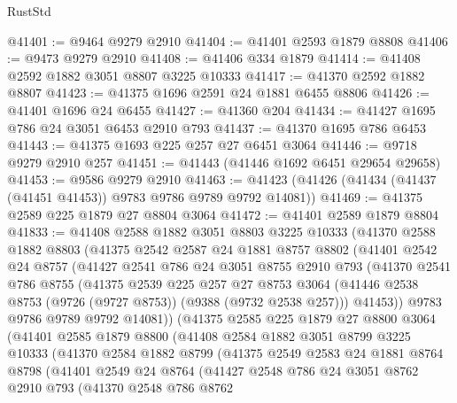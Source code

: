 \begin{lexlean}{RustStd}
\begin{coremodule}
@41401 := @9464 @9279 @2910
@41404 := @41401 @2593 @1879 @8808
@41406 := @9473 @9279 @2910
@41408 := @41406 @334 @1879
@41414 := @41408 @2592 @1882 @3051 @8807 @3225 @10333
@41417 := @41370 @2592 @1882 @8807
@41423 := @41375 @1696 @2591 @24 @1881 @6455 @8806
@41426 := @41401 @1696 @24 @6455
@41427 := @41360 @204
@41434 := @41427 @1695 @786 @24 @3051 @6453 @2910 @793
@41437 := @41370 @1695 @786 @6453
@41443 := @41375 @1693 @225 @257 @27 @6451 @3064
@41446 := @9718 @9279 @2910 @257
@41451 := @41443 (@41446 @1692 @6451 @29654 @29658)
@41453 := @9586 @9279 @2910
@41463 := @41423 (@41426 (@41434 (@41437 (@41451 @41453)) @9783 @9786 @9789 @9792 @14081))
@41469 := @41375 @2589 @225 @1879 @27 @8804 @3064
@41472 := @41401 @2589 @1879 @8804
@41833 := @41408
    @2588
    @1882
    @3051
    @8803
    @3225
    @10333
    (@41370
      @2588
      @1882
      @8803
      (@41375
        @2542
        @2587
        @24
        @1881
        @8757
        @8802
        (@41401
          @2542
          @24
          @8757
          (@41427
            @2541
            @786
            @24
            @3051
            @8755
            @2910
            @793
            (@41370
              @2541
              @786
              @8755
              (@41375
                @2539
                @225
                @257
                @27
                @8753
                @3064
                (@41446 @2538 @8753 (@9726 (@9727 @8753)) (@9388 (@9732 @2538 @257)))
                @41453))
            @9783
            @9786
            @9789
            @9792
            @14081))
        (@41375
          @2585
          @225
          @1879
          @27
          @8800
          @3064
          (@41401
            @2585
            @1879
            @8800
            (@41408
              @2584
              @1882
              @3051
              @8799
              @3225
              @10333
              (@41370
                @2584
                @1882
                @8799
                (@41375
                  @2549
                  @2583
                  @24
                  @1881
                  @8764
                  @8798
                  (@41401
                    @2549
                    @24
                    @8764
                    (@41427
                      @2548
                      @786
                      @24
                      @3051
                      @8762
                      @2910
                      @793
                      (@41370
                        @2548
                        @786
                        @8762

\end{coremodule}
\end{lexlean}
